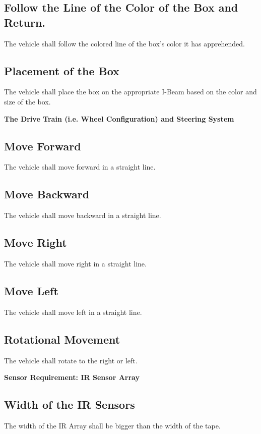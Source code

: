 \documentclass{article}
\begin{document}
\subsection{Follow the Line of the Color of the Box and Return.} 
The vehicle shall follow the colored line of the box’s color it has apprehended.

\subsection{Placement of the Box}
The vehicle shall place the box on the appropriate I-Beam based on the color and size of the box.\vspace{2em}\newline

\noindent\textbf{\Large The Drive Train (i.e. Wheel Configuration) and Steering System}

\subsection{Move Forward}
The vehicle shall move forward in a straight line.

\subsection{Move Backward}
The vehicle shall move backward in a straight line.

\subsection{Move Right}
The vehicle shall move right in a straight line.

\subsection{Move Left}
The vehicle shall move left in a straight line.

\subsection{Rotational Movement}
The vehicle shall rotate to the right or left.\vspace{2em}\newline

\noindent\textbf{\Large Sensor Requirement: IR Sensor Array}

\subsection{Width of the IR Sensors}
The width of the IR Array shall be bigger than the width of the tape.
\end{document}
